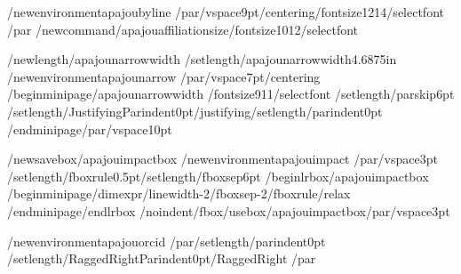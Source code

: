 /newenvironment{apajoubyline}
  {/par/vspace{9pt}/centering/fontsize{12}{14}/selectfont}
  {/par}
/newcommand{/apajouaffiliationsize}{/fontsize{10}{12}/selectfont}

/newlength{/apajounarrowwidth}
/setlength{/apajounarrowwidth}{4.6875in}
/newenvironment{apajounarrow}
  {/par/vspace{7pt}/centering
   /begin{minipage}{/apajounarrowwidth}%
   /fontsize{9}{11}/selectfont
   /setlength{/parskip}{6pt}%
   /setlength{/JustifyingParindent}{0pt}/justifying/setlength{/parindent}{0pt}}
  {/end{minipage}/par/vspace{10pt}}

/newsavebox{/apajouimpactbox}
/newenvironment{apajouimpact}
  {/par/vspace{3pt}%
   /setlength{/fboxrule}{0.5pt}/setlength{/fboxsep}{6pt}%
   /begin{lrbox}{/apajouimpactbox}%
   /begin{minipage}{/dimexpr/linewidth-2/fboxsep-2/fboxrule/relax}}
  {/end{minipage}/end{lrbox}%
   /noindent/fbox{/usebox{/apajouimpactbox}}/par/vspace{3pt}}

/newenvironment{apajouorcid}
  {/par/setlength{/parindent}{0pt}%
   /setlength{/RaggedRightParindent}{0pt}/RaggedRight}
  {/par}

